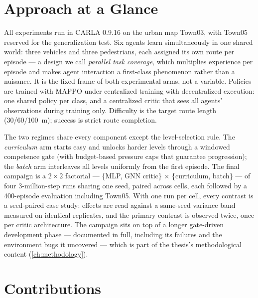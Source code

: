 \section{Approach at a Glance}
\label{sec:approach}

All experiments run in CARLA 0.9.16 on the urban map Town03, with
Town05 reserved for the generalization test. Six agents learn
simultaneously in one shared world: three vehicles and three
pedestrians, each assigned its own route per episode --- a design we
call \emph{parallel task coverage}, which multiplies experience per
episode and makes agent interaction a first-class phenomenon rather
than a nuisance. It is the fixed frame of both experimental arms, not a
variable. Policies are trained with MAPPO under centralized training
with decentralized execution: one shared policy per class, and a
centralized critic that sees all agents' observations during training
only. Difficulty is the target route length (30/60/\SI{100}{m});
success is strict route completion.

The two regimes share every component except the level-selection rule.
The \emph{curriculum} arm starts easy and unlocks harder levels through
a windowed competence gate (with budget-based pressure caps that
guarantee progression); the \emph{batch} arm interleaves all levels
uniformly from the first episode. The final campaign is a $2 \times 2$
factorial --- \{MLP, GNN critic\} $\times$ \{curriculum, batch\} ---
of four 3-million-step runs sharing one seed, paired across cells, each
followed by a 400-episode evaluation including Town05. With one run per
cell, every contrast is a seed-paired case study: effects are read
against a same-seed variance band measured on identical replicates, and
the primary contrast is observed twice, once per critic architecture.
The campaign sits on top of a longer gate-driven development phase ---
documented in full, including its failures and the environment bugs it
uncovered --- which is part of the thesis's methodological content
(\cref{ch:methodology}).

\section{Contributions}
\label{sec:contributions}

